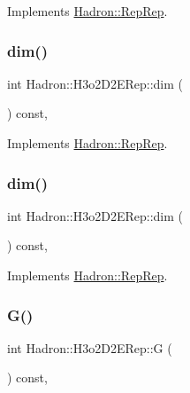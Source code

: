 Implements \mbox{\hyperlink{structHadron_1_1RepRep_a92c8802e5ed7afd7da43ccfd5b7cd92b}{Hadron\+::\+Rep\+Rep}}.

\mbox{\label{structHadron_1_1H3o2D2ERep_ad7e811309fce4b8ce92dd11fb8193cb2}} 
\subsubsection{\texorpdfstring{dim()}{dim()}\hspace{0.1cm}{\footnotesize\ttfamily [2/3]}}
{\footnotesize\ttfamily int Hadron\+::\+H3o2\+D2\+E\+Rep\+::dim (\begin{DoxyParamCaption}{ }\end{DoxyParamCaption}) const\hspace{0.3cm}{\ttfamily [inline]}, {\ttfamily [virtual]}}



Implements \mbox{\hyperlink{structHadron_1_1RepRep_a92c8802e5ed7afd7da43ccfd5b7cd92b}{Hadron\+::\+Rep\+Rep}}.

\mbox{\label{structHadron_1_1H3o2D2ERep_ad7e811309fce4b8ce92dd11fb8193cb2}} 
\subsubsection{\texorpdfstring{dim()}{dim()}\hspace{0.1cm}{\footnotesize\ttfamily [3/3]}}
{\footnotesize\ttfamily int Hadron\+::\+H3o2\+D2\+E\+Rep\+::dim (\begin{DoxyParamCaption}{ }\end{DoxyParamCaption}) const\hspace{0.3cm}{\ttfamily [inline]}, {\ttfamily [virtual]}}



Implements \mbox{\hyperlink{structHadron_1_1RepRep_a92c8802e5ed7afd7da43ccfd5b7cd92b}{Hadron\+::\+Rep\+Rep}}.

\mbox{\label{structHadron_1_1H3o2D2ERep_aaa942303f4efab9a27088a542e7ba809}} 
\subsubsection{\texorpdfstring{G()}{G()}\hspace{0.1cm}{\footnotesize\ttfamily [1/2]}}
{\footnotesize\ttfamily int Hadron\+::\+H3o2\+D2\+E\+Rep\+::G (\begin{DoxyParamCaption}{ }\end{DoxyParamCaption}) const\hspace{0.3cm}{\ttfamily [inline]}, {\ttfamily [virtual]}}

